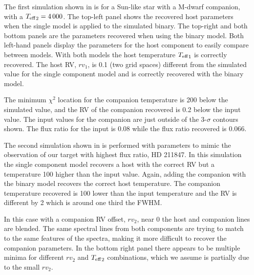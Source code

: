 The first simulation shown in  is for a Sun-like star with a M-dwarf companion, with a \({T_{\mathrm{eff}}}_{2} =4\,000\)\K{}. The top-left panel shows the recovered host parameters when the single model is applied to the simulated binary. The top-right and both bottom panels are the parameters recovered when using the binary model. Both left-hand panels display the parameters for the host component to easily compare between models. With both models the host temperature \({T_{\mathrm{eff}}}_{1}\) is correctly recovered. The host {RV}, \({rv}_1\), is 0.1\kmps{} (two grid spaces) different from the simulated value for the single component model and is correctly recovered with the binary model.

The minimum \(\chi^2\) location for the companion temperature is 200\K{} below the simulated value, and the {RV} of the companion recovered is 0.2\kmps{} below the input value. The input values for the companion are just outside of the 3-\(\sigma\) contours shown. The flux ratio for the input is 0.08 while the flux ratio recovered is 0.066.

The second simulation shown in  is performed with parameters to mimic the observation of our target with highest flux ratio, {HD 211847}. In this simulation the single component model recovers a host with the correct {RV} but a temperature 100\K{} higher than the input value. Again, adding the companion with the binary model recovers the correct host temperature. The companion temperature recovered is 100\K{} lower than the input temperature and the {RV} is different by 2\kmps{} which is around one third the {FWHM}.

In this case with a companion {RV} offset, \({rv}_2\), near 0\kmps{} the host and companion lines are blended. The same spectral lines from both components are trying to match to the same features of the spectra, making it more difficult to recover the companion parameters. In the bottom right panel there appears to be multiple minima for different \({rv}_2\) and \({T_{\mathrm{eff}}}_{2}\) combinations, which we assume is partially due to the small \({rv}_2\).

